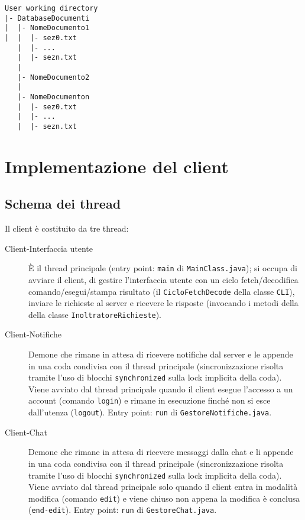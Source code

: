 \documentclass[a4paper,12pt]{article}
\begin{document}
  \begin{verbatim}  
User working directory
|- DatabaseDocumenti
|  |- NomeDocumento1
|  |  |- sez0.txt
   |  |- ...
   |  |- sezn.txt
   |
   |- NomeDocumento2
   | 
   |- NomeDocumenton
   |  |- sez0.txt
   |  |- ...
   |  |- sezn.txt
 \end{verbatim}
 
 \section{ Implementazione del client }
 
 \subsection{ Schema dei thread }
 
 Il client è costituito da tre thread:
 
 \begin{description}
  \item[Client-Interfaccia utente] \`E il thread principale (entry point: \texttt{main} di \texttt{MainClass.java}); si occupa di avviare il client, di gestire l'interfaccia utente con un ciclo fetch/decodifica comando/esegui/stampa risultato (il \texttt{CicloFetchDecode} della classe \texttt{CLI}), inviare le richieste al server e ricevere le risposte (invocando i metodi della della classe \texttt{InoltratoreRichieste}).
  
  \item[Client-Notifiche] Demone che rimane in attesa di ricevere notifiche dal server e le appende in una coda condivisa con il thread principale (sincronizzazione risolta tramite l'uso di blocchi \texttt{synchronized} sulla lock implicita della coda). Viene avviato dal thread principale quando il client esegue l'accesso a un account (comando \texttt{login}) e rimane in esecuzione finché non si esce dall'utenza (\texttt{logout}). Entry point: \texttt{run} di \texttt{GestoreNotifiche.java}.
  
  \item[Client-Chat] Demone che rimane in attesa di ricevere messaggi dalla chat e li appende in una coda condivisa con il thread principale (sincronizzazione risolta tramite l'uso di blocchi \texttt{synchronized} sulla lock implicita della coda). Viene avviato dal thread principale solo quando il client entra in modalità modifica (comando \texttt{edit}) e viene chiuso non appena la modifica è conclusa (\texttt{end-edit}). Entry point: \texttt{run} di \texttt{GestoreChat.java}.
 \end{description}
 
\end{document}
